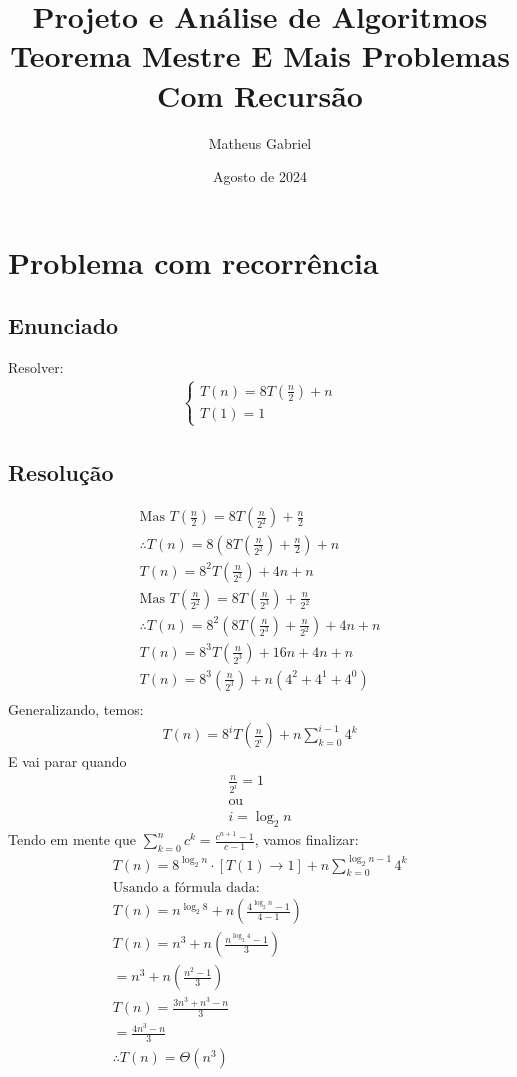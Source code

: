 \documentclass{article}
\title{Projeto e Análise de Algoritmos \\
\large Teorema Mestre E Mais Problemas Com Recursão}
\author{Matheus Gabriel}
\date{Agosto de 2024}
\begin{document}
\maketitle

\section{Problema com recorrência}
\subsection{Enunciado}
Resolver: 
\begin{align*}
\begin{cases}
T(n) = 8T(\frac{n}{2}) + n \\
T(1) = 1
\end{cases}
\end{align*}

\subsection{Resolução}
\begin{align*}
    \text{Mas }T(\frac{n}{2}) = 8T(\frac{n}{2^2}) + \frac{n}{2} \\
    \therefore T(n) =  8(8T(\frac{n}{2^2})+\frac{n}{2}) + n \\
    T(n) = 8^2 T(\frac{n}{2^2}) + 4n + n \\
    \text{Mas } T(\frac{n}{2^2}) = 8T(\frac{n}{2^3}) + \frac{n}{2^2} \\
    \therefore T(n) = 8^2(8T(\frac{n}{2^3}) + \frac{n}{2^2}) + 4n + n \\
    T(n) = 8^3T(\frac{n}{2^3}) + 16n + 4n + n \\
    T(n) = 8^3(\frac{n}{2^3}) + n (4^2+4^1+4^0) \\
\end{align*}
Generalizando, temos:
\begin{align*}
    T(n) = 8^i T(\frac{n}{2^i}) + n\sum^{i-1}_{k=0}4^k
\end{align*}
E vai parar quando 
\begin{align*}
    \frac{n}{2^i} = 1 \\
    \text{ou}\\
    \boxed{i = \log_2 n}
\end{align*}
Tendo em mente que $\boxed{\sum^n_{k=0}c^k=\frac{c^{n+1}-1}{c-1}}$, vamos finalizar:
\begin{align*}
    T(n) = 8^{\log_2 n}\cdot [T(1) \rightarrow 1] + n \sum^{\log_2 n - 1}_{k=0}4^k \\
    \text{Usando a fórmula dada:} \\
    T(n) = n^{\log_2 8} + n(\frac{4^{\log_2 n} - 1}{4-1}) \\
    T(n) = n^{3} + n(\frac{n^{\log_2 4} - 1}{3}) \\
    = n^3 + n(\frac{n^2 -1}{3}) \\
    T(n) = \frac{3n^3 + n^3 - n}{3} \\
    = \frac{4n^3 -n}{3} \\
    \therefore \boxed{T(n) = \Theta(n^3)}
\end{align*}
\end{document}
